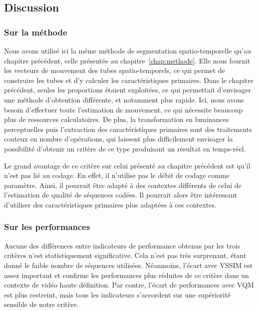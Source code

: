 \subsection{Discussion}
\subsubsection{Sur la méthode}
Nous avons utilisé ici la même méthode de segmentation spatio-temporelle qu'au chapitre précédent, celle présentée au chapitre~\ref{chap:methode}. Elle nous fournit les vecteurs de mouvement des tubes spatio-temporels, ce qui permet de construire les tubes et d'y calculer les caractéristiques primaires. Dans le chapitre précédent, seules les proportions étaient exploitées, ce qui permettait d'envisager une méthode d'obtention différente, et notamment plus rapide. Ici, nous avons besoin d'effectuer toute l'estimation de mouvement, ce qui nécessite beaucoup plus de ressources calculatoires. De plus, la transformation en luminances perceptuelles puis l'extraction des caractéristiques primaires sont des traitements couteux en nombre d'opérations, qui laissent plus difficilement envisager la possibilité d'obtenir un critère de ce type produisant un résultat en temps-réel.

Le grand avantage de ce critère sur celui présenté au chapitre précédent est qu'il n'est pas lié au codage. En effet, il n'utilise pas le débit de codage comme paramètre. Ainsi, il pourrait être adapté à des contextes différents de celui de l'estimation de qualité de séquences codées. Il pourrait alors être intéressant d'utiliser des caractéristiques primaires plus adaptées à ces contextes.



\subsubsection{Sur les performances}
Aucune des différences entre indicateurs de performance obtenus par les trois critères n'est statistiquement significative. Cela n'est pas très surprenant, étant donné le faible nombre de séquences utilisées. Néanmoins, l'écart avec VSSIM est assez important et confirme les performances plus réduites de ce critère dans un contexte de vidéo haute définition. Par contre, l'écart de performances avec VQM est plus restreint, mais tous les indicateurs s'accordent sur une supériorité sensible de notre critère.

